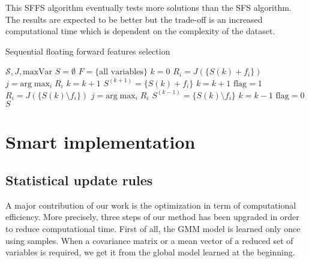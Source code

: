 \documentclass[a4paper,11pt,DIV=16,abstracton]{scrartcl}
\begin{document}
            This SFFS algorithm eventually tests more solutions than the SFS algorithm. The results are expected to be better but the trade-off is an increased computational time which is dependent on the complexity of the dataset.

            \begin{algorithm}
            \caption{Sequential floating forward features selection\label{alg:sffs}}
            {\fontsize{10}{10}\selectfont
            \begin{algorithmic}[1]
            \REQUIRE $\mathcal{S},J,\text{maxVar}$
            \STATE $S=\emptyset$
            \STATE $F=\text{\{all variables\}}$
            \STATE $k=0$
            \STATE $R_i = J(\{S{(k)} + f_i\})$
            \ENDFOR
            \STATE $j=\text{arg} \max_{i} R_i$
            \STATE $k=k+1$
            \ELSE
            \STATE $S^{(k+1)} = \{S{(k)} + f_i\}$
            \STATE $k=k+1$
            \STATE $\text{flag}=1$
            \STATE $R_i = J(\{S{(k)}\setminus f_i\})$
            \ENDFOR
            \STATE $j=\text{arg} \max_{i} R_i$
            \STATE $S^{(k-1)} = \{S{(k)} \setminus f_i\}$
            \STATE $k=k-1$
            \ELSE
            \STATE $\text{flag}=0$
            \ENDIF
            \ENDWHILE
            \ENDIF
            \ENDWHILE
            \RETURN $S$
            \end{algorithmic}
            }
            \end{algorithm}


\section{Smart implementation}
\label{sec:implementation}

    \subsection{Statistical update rules}
    A major contribution of our work is the optimization in term of computational efficiency. More precisely, three steps of our method has been upgraded in order to reduce computational time. First of all, the GMM model is learned only once using samples. When a covariance matrix or a mean vector of a reduced set of variables is required, we get it from the global model learned at the beginning.
\end{document}
